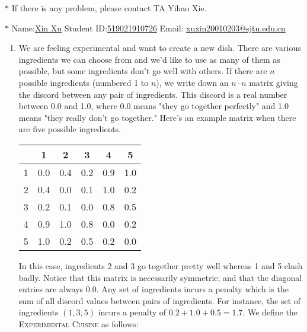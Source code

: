 \documentclass[12pt,a4paper]{article}
\theoremstyle{definition}
\begin{document}
\noindent

\noindent{}
\begin{center}
\footnotesize{\color{red}$*$ If there is any problem, please contact TA Yihao Xie. }

\footnotesize{\color{blue}$*$ Name:\underline{Xin Xu}  \quad Student ID:\underline{519021910726} \quad Email: \underline{xuxin20010203@sjtu.edu.cn}}
\end{center}

\begin{enumerate}
    \item We are feeling experimental and want to create a new dish. There are various ingredients we can choose from and we'd like to use as many of them as possible, but some ingredients don't go well with others. If there are $n$ possible ingredients (numbered 1 to $n$), we write down an $n\cdot n$ matrix giving the discord between any pair of ingredients. This discord is a real number between 0.0 and 1.0, where 0.0 means "they go together perfectly" and 1.0 means "they really don't go together." Here's an example matrix when there are five possible ingredients.
    \begin{center}
        \begin{tabular}{|c|ccccc|}
        \hline
             & 1  & 2 & 3 & 4 & 5\\
        \hline
            1 & 0.0 & 0.4 & 0.2 & 0.9 & 1.0\\
            2 & 0.4 & 0.0 & 0.1 & 1.0 & 0.2\\
            3 & 0.2 & 0.1 & 0.0 & 0.8 & 0.5\\
            4 & 0.9 & 1.0 & 0.8 & 0.0 & 0.2\\
            5 & 1.0 & 0.2 & 0.5 & 0.2 & 0.0\\
        \hline
        \end{tabular}
    \end{center}
    In this case, ingredients 2 and 3 go together pretty well whereas 1 and 5 clash badly. Notice that this matrix is necessarily symmetric; and that the diagonal entries are always 0.0. Any set of ingredients incurs a penalty which is the sum of all discord values between pairs of ingredients. For instance, the set of ingredients $(1,3,5)$ incurs a penalty of $0.2+1.0+0.5 = 1.7$. We define the \textsc{Experimental Cuisine} as follows:


\end{enumerate}
\end{document}
